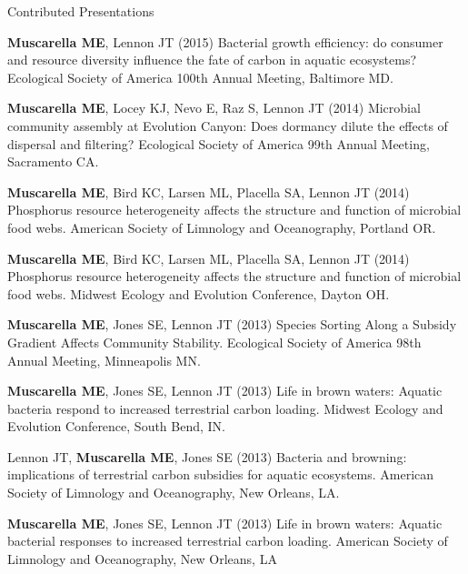 \documentclass{resume} %
\begin{document}
\begin{rSection}{Contributed Presentations}

  {\bf Muscarella ME}, Lennon JT (2015) Bacterial growth efficiency: do
  consumer and resource diversity influence the fate of carbon in aquatic
  ecosystems? Ecological Society of America 100th Annual Meeting, Baltimore MD.

  {\bf Muscarella ME}, Locey KJ, Nevo E, Raz S, Lennon JT (2014) Microbial
  community assembly at Evolution Canyon: Does dormancy dilute the effects of
  dispersal and filtering? Ecological Society of America 99th Annual Meeting,
  Sacramento CA.

  {\bf Muscarella ME}, Bird KC, Larsen ML, Placella SA, Lennon JT (2014)
  Phosphorus resource heterogeneity affects the structure and function of
  microbial food webs. American Society of Limnology and Oceanography, Portland
  OR.

  {\bf Muscarella ME}, Bird KC, Larsen ML, Placella SA, Lennon JT (2014)
  Phosphorus resource heterogeneity affects the structure and function of
  microbial food webs. Midwest Ecology and Evolution Conference, Dayton OH.

  {\bf Muscarella ME}, Jones SE, Lennon JT (2013) Species Sorting Along a
  Subsidy Gradient Affects Community Stability. Ecological Society of America
  98th Annual Meeting, Minneapolis MN.

  {\bf Muscarella ME}, Jones SE, Lennon JT (2013) Life in brown waters: Aquatic
  bacteria respond to increased terrestrial carbon loading. Midwest Ecology and
  Evolution Conference, South Bend, IN.

  Lennon JT, {\bf Muscarella ME}, Jones SE (2013) Bacteria and browning:
  implications of terrestrial carbon subsidies for aquatic ecosystems. American
  Society of Limnology and Oceanography, New Orleans, LA.

  {\bf Muscarella ME}, Jones SE, Lennon JT (2013) Life in brown waters: Aquatic
  bacterial responses to increased terrestrial carbon loading. American Society
  of Limnology and Oceanography, New Orleans, LA


\end{rSection}
\end{document}
